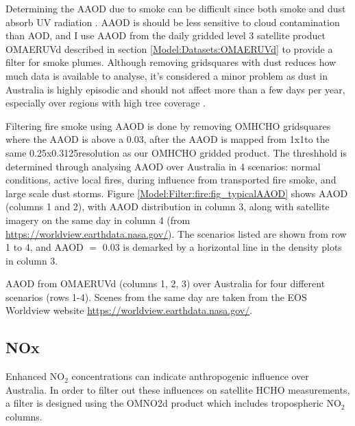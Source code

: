     Determining the AAOD due to smoke can be difficult since both smoke and dust absorb UV radiation \parencite{Ahn2008,Marais2012}.
    AAOD is should be less sensitive to cloud contamination than AOD, and I use AAOD from the daily gridded level 3 satellite product OMAERUVd \parencite{Ahn2008} described in section \ref{Model:Datasets:OMAERUVd} to provide a filter for smoke plumes.
    Although removing gridsquares with dust reduces how much data is available to analyse, it's considered a minor problem as dust in Australia is highly episodic and should not affect more than a few days per year, especially over regions with high tree coverage \parencite{Shao2007}.
    
    Filtering fire smoke using AAOD is done by removing OMHCHO gridsquares where the AAOD is above a 0.03, after the AAOD is mapped from 1x1\degr to the same 0.25x0.3125\degr resolution as our OMHCHO gridded product.
    The threshhold is determined through analysing AAOD over Australia in 4 scenarios: normal conditions, active local fires, during influence from transported fire smoke, and large scale dust storms.
    Figure \ref{Model:Filter:fire:fig_typicalAAOD} shows AAOD (columns 1 and 2), with AAOD distribution in column 3, along with satellite imagery on the same day in column 4 (from \url{https://worldview.earthdata.nasa.gov/}).
    The scenarios listed are shown from row 1 to 4, and AAOD $=$ 0.03 is demarked by a horizontal line in the density plots in column 3.
    
      {AAOD from OMAERUVd (columns 1, 2, 3) over Australia for four different scenarios (rows 1-4). Scenes from the same day are taken from the EOS Worldview website \url{https://worldview.earthdata.nasa.gov/}.}
      {\label{Model:Filter:fire:fig_typicalAAOD}}
  
  
  
  \subsection{NOx}
    \label{Model:Filter:NOx}
    
    Enhanced NO$_2$ concentrations can indicate anthropogenic influence over Australia.
    In order to filter out these influences on satellite HCHO measurements, a filter is designed using the OMNO2d product which includes tropospheric NO$_2$ columns.
    
